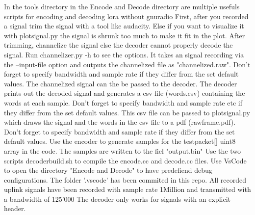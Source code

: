 {}\markdownRendererInterblockSeparator
{}In the tools directory in the Encode and Decode directory are multiple usefuls scripts for encoding and decoding lora without gnuradio\markdownRendererInterblockSeparator
{}\markdownRendererOlBegin
{}First, after you recorded a signal trim the signal with a tool like audacity. Else if you want to visualize it with plot\markdownRendererUnderscore{}signal.py the signal is shrunk too much to make it fit in the plot.\markdownRendererOlItemEnd 
{}After trimming, channelize the signal else the decoder cannot properly decode the signal. Run channelizer.py -h to see the options. It takes an signal recording via the --input-file option and outputs the channelized file as "channelized.raw". Don't forget to specify bandwidth and sample rate if they differ from the set default values.\markdownRendererOlItemEnd 
{}The channelized signal can the be passed to the decoder. The decoder prints out the decoded signal and generates a csv file (words.csv) containing the words at each sample. Don't forget to specify bandwidth and sample rate etc if they differ from the set default values.\markdownRendererOlItemEnd 
{}This csv file can be passed to plot\markdownRendererUnderscore{}signal.py which draws the signal and the words in the csv file to a pdf (rawframe.pdf). Don't forget to specify bandwidth and sample rate if they differ from the set default values.\markdownRendererOlItemEnd 
\markdownRendererOlEnd \markdownRendererInterblockSeparator
{}Use the encoder to generate samples for the test\markdownRendererUnderscore{}packet[] uint8 array in the code. The samples are written to the fiel "output.bin"\markdownRendererInterblockSeparator
{}Use the two scripts decoderbuild.sh to compile the encode.cc and decode.cc files. \markdownRendererInterblockSeparator
{}Use VsCode to open the directory "Encode and Decode" to have predefiend debug configurations. The folder '.vscode' has been commited in this repo.\markdownRendererInterblockSeparator
{}All recorded uplink signals have been recorded with sample rate 1Million and transmitted with a bandwidth of 125'000\markdownRendererInterblockSeparator
{}The decoder only works for signals with an explicit header.\relax